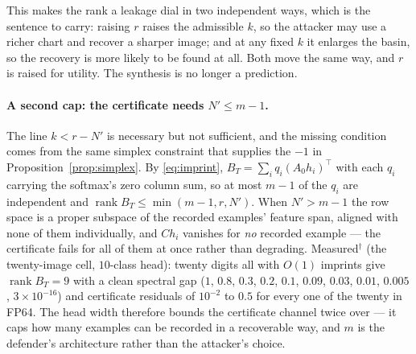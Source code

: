 This makes the rank a leakage dial in two independent ways, which is the
sentence to carry: raising $r$ raises the admissible $k$, so the attacker may
use a richer chart and recover a sharper image; and at any fixed $k$ it
enlarges the basin, so the recovery is more likely to be found at all. Both
move the same way, and $r$ is raised for utility. The synthesis is no longer a prediction.

\paragraph{A second cap: the certificate needs $N'\le m-1$.} The line
$k<r-N'$ is necessary but not sufficient, and the missing condition comes
from the same simplex constraint that supplies the $-1$ in
Proposition~\ref{prop:simplex}. By \eqref{eq:imprint}, $B_T=\sum_i
q_i(A_0h_i)^{\!\top}$ with each $q_i$ carrying the softmax's zero column sum,
so at most $m-1$ of the $q_i$ are independent and
$\operatorname{rank}B_T\le\min(m-1,r,N')$. When $N'>m-1$ the row space is a
proper subspace of the recorded examples' feature span, aligned with none of
them individually, and $Ch_i$ vanishes for \emph{no} recorded example ---
the certificate fails for all of them at once rather than degrading.
Measured$^\dagger$ (the twenty-image cell, $10$-class head): twenty digits all
with $O(1)$ imprints give $\operatorname{rank}B_T=9$ with a clean spectral gap
($1$, $0.8$, $0.3$, $0.2$, $0.1$, $0.09$, $0.03$, $0.01$, $0.005$,
$3\times10^{-16}$) and certificate residuals of $10^{-2}$ to $0.5$ for every
one of the twenty in FP64. The head width therefore bounds the certificate
channel twice over --- it caps how many examples can be recorded in a
recoverable way, and $m$ is the defender's architecture rather than the
attacker's choice.


